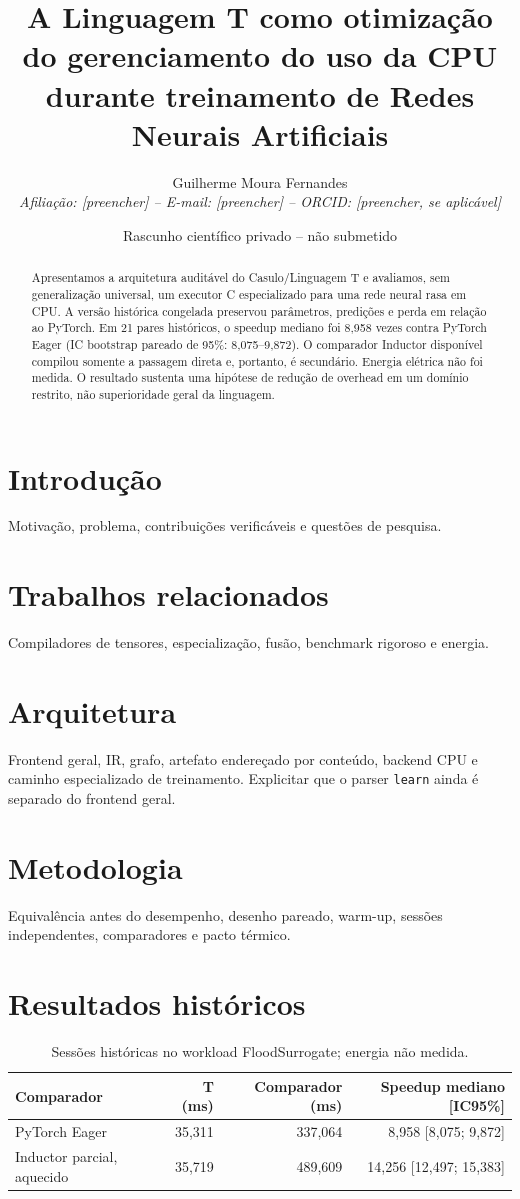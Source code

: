 \documentclass[11pt]{article}
\title{A Linguagem T como otimização do gerenciamento do uso da CPU durante treinamento de Redes Neurais Artificiais}
\author{Guilherme Moura Fernandes\\\textit{Afiliação: [preencher] -- E-mail: [preencher] -- ORCID: [preencher, se aplicável]}}
\date{Rascunho científico privado -- não submetido}
\begin{document}
\maketitle
\begin{abstract}
Apresentamos a arquitetura auditável do Casulo/Linguagem T e avaliamos, sem generalização universal, um executor C especializado para uma rede neural rasa em CPU. A versão histórica congelada preservou parâmetros, predições e perda em relação ao PyTorch. Em 21 pares históricos, o speedup mediano foi 8,958 vezes contra PyTorch Eager (IC bootstrap pareado de 95\%: 8,075--9,872). O comparador Inductor disponível compilou somente a passagem direta e, portanto, é secundário. Energia elétrica não foi medida. O resultado sustenta uma hipótese de redução de overhead em um domínio restrito, não superioridade geral da linguagem.
\end{abstract}
\section{Introdução}
Motivação, problema, contribuições verificáveis e questões de pesquisa.
\section{Trabalhos relacionados}
Compiladores de tensores, especialização, fusão, benchmark rigoroso e energia.
\section{Arquitetura}
Frontend geral, IR, grafo, artefato endereçado por conteúdo, backend CPU e caminho especializado de treinamento. Explicitar que o parser \texttt{learn} ainda é separado do frontend geral.
\section{Metodologia}
Equivalência antes do desempenho, desenho pareado, warm-up, sessões independentes, comparadores e pacto térmico.
\section{Resultados históricos}
\begin{table}[h]\centering
\caption{Sessões históricas no workload FloodSurrogate; energia não medida.}
\begin{tabular}{lrrr}\toprule
Comparador & T (ms) & Comparador (ms) & Speedup mediano [IC95\%]\\\midrule
PyTorch Eager & 35,311 & 337,064 & 8,958 [8,075; 9,872]\\
Inductor parcial, aquecido & 35,719 & 489,609 & 14,256 [12,497; 15,383]\\\bottomrule
\end{tabular}
\end{table}
\end{document}
